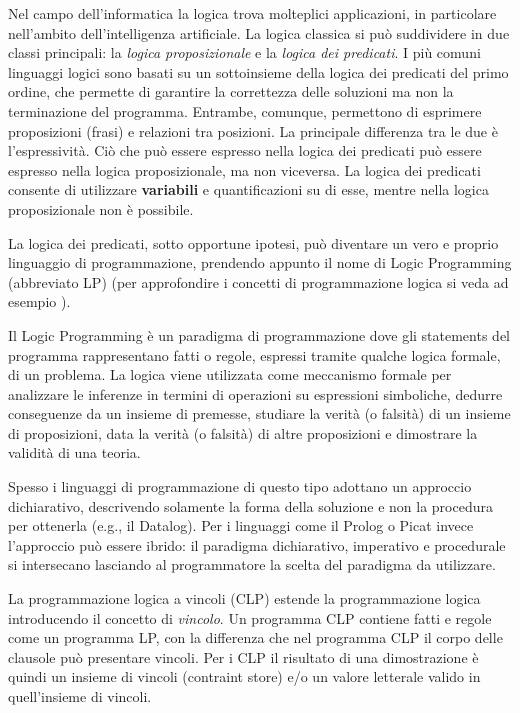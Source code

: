 \documentclass[12pt,a4paper,openright]{book} %
\begin{document}
Nel campo dell'informatica la logica trova molteplici applicazioni, in particolare nell'ambito dell'intelligenza artificiale. La logica classica si può suddividere in due classi principali: la \emph{logica proposizionale} e la \emph{logica dei predicati}.  I più comuni linguaggi logici sono basati su un sottoinsieme della logica dei predicati del primo ordine, che permette di garantire la correttezza delle soluzioni ma non la terminazione del programma. Entrambe, comunque, permettono di esprimere proposizioni (frasi) e relazioni tra posizioni. La principale differenza tra le due è l'espressività. Ciò che può essere espresso nella logica dei predicati può essere espresso nella logica proposizionale, ma non viceversa. La logica dei predicati consente di utilizzare \textbf{variabili} e quantificazioni su di esse, mentre nella logica proposizionale non è possibile.

La logica dei predicati, sotto opportune ipotesi, può diventare un vero e proprio linguaggio di programmazione, prendendo appunto il nome di Logic Programming (abbreviato LP) (per approfondire i concetti di programmazione logica si veda ad esempio \cite{Console97}).

Il Logic Programming è un paradigma di programmazione dove gli statements del programma rappresentano fatti o regole, espressi tramite qualche logica formale, di un problema. La logica viene utilizzata come meccanismo formale per analizzare le inferenze in termini di operazioni su espressioni simboliche, dedurre conseguenze da un insieme di premesse, studiare la verità (o falsità) di un insieme di proposizioni, data la verità (o falsità) di altre proposizioni e dimostrare la validità di una teoria.

Spesso i linguaggi di programmazione di questo tipo adottano un approccio dichiarativo, descrivendo solamente la forma della soluzione e non la procedura per ottenerla (e.g., il Datalog). Per i linguaggi come il Prolog o Picat invece l'approccio può essere ibrido: il paradigma dichiarativo, imperativo e procedurale si intersecano lasciando al programmatore la scelta del paradigma da utilizzare.

La programmazione logica a vincoli (CLP) estende la programmazione logica introducendo il concetto di \emph{vincolo}. Un programma CLP contiene fatti e regole come un programma LP, con la differenza che nel programma CLP il corpo delle clausole può presentare vincoli. Per i CLP il risultato di una dimostrazione è quindi un insieme di vincoli (contraint store) e/o un valore letterale valido in quell'insieme di vincoli.
\end{document}
